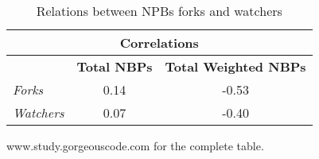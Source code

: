 \begin{table}[H]
\begin{center}
{\scriptsize
\begin{threeparttable}
\begin{tabular}{|l||c|c|} \hline
\multicolumn{3}{|c|}{Correlations} \\ \hline
                       & \textbf{Total NBPs}  & \textbf{Total Weighted NBPs}  \\ \hline\hline
\emph{Forks         }  & 0.14                 & -0.53                       \\ \hline
\emph{Watchers      }  & 0.07                 & -0.40                       \\ \hline
\end{tabular}
\begin{tablenotes}
  \item www.study.gorgeouscode.com for the complete table.
\end{tablenotes}
\end{threeparttable}
}
\end{center}
\caption{Relations between NPBs forks and watchers}
\end{table}